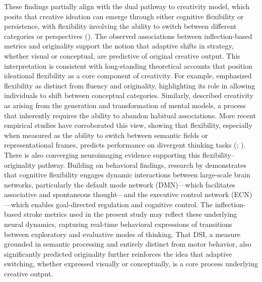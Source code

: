 \documentclass[../MA_Thesis.tex]{subfiles}
\begin{document}
These findings partially align with the dual pathway to creativity model, which posits that creative ideation can emerge through either cognitive flexibility or persistence, with flexibility involving the ability to switch between different categories or perspectives (\cite{nijstad_dual_2010}). The observed associations between inflection-based metrics and originality support the notion that adaptive shifts in strategy, whether visual or conceptual, are predictive of original creative output. This interpretation is consistent with long-standing theoretical accounts that position ideational flexibility as a core component of creativity. For example, \textcite{guilford_nature_1967} emphasized flexibility as distinct from fluency and originality, highlighting its role in allowing individuals to shift between conceptual categories. Similarly, \textcite{johnson-laird_freedom_1988} described creativity as arising from the generation and transformation of mental models, a process that inherently requires the ability to abandon habitual associations. More recent empirical studies have corroborated this view, showing that flexibility, especially when measured as the ability to switch between semantic fields or representational frames, predicts performance on divergent thinking tasks (\cite{benedek_differential_2012}; \cite{kenett_structure_2016}). There is also converging neuroimaging evidence supporting this flexibility–originality pathway. Building on behavioral findings, research by \textcite{beaty_creative_2016} demonstrates that cognitive flexibility engages dynamic interactions between large-scale brain networks, particularly the default mode network (DMN)—which facilitates associative and spontaneous thought—and the executive control network (ECN)—which enables goal-directed regulation and cognitive control. The inflection-based stroke metrics used in the present study may reflect these underlying neural dynamics, capturing real-time behavioral expressions of transitions between exploratory and evaluative modes of thinking. That DSI, a measure grounded in semantic processing and entirely distinct from motor behavior, also significantly predicted originality further reinforces the idea that adaptive switching, whether expressed visually or conceptually, is a core process underlying creative output.
\end{document}
